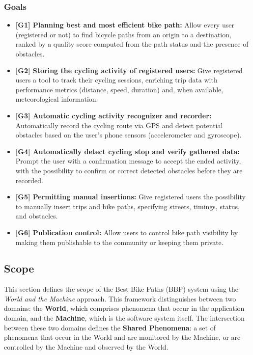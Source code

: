 \subsubsection{Goals}
\begin{itemize}
    \item[] \textbf{[G1] Planning best and most efficient bike path:} 
    Allow every user (registered or not) to find bicycle paths from an origin to a destination, ranked by a quality score computed from the path status and the presence of obstacles.

    \item[] \textbf{[G2] Storing the cycling activity of registered users:} 
    Give registered users a tool to track their cycling sessions, enriching trip data with performance metrics (distance, speed, duration) and, when available, meteorological information.

    \item[] \textbf{[G3] Automatic cycling activity recognizer and recorder:} 
    Automatically record the cycling route via GPS and detect potential obstacles based on the user's phone sensors (accelerometer and gyroscope).

    \item[] \textbf{[G4] Automatically detect cycling stop and verify gathered data:} 
    Prompt the user with a confirmation message to accept the ended activity, with the possibility to confirm or correct detected obstacles before they are recorded.

    \item[] \textbf{[G5] Permitting manual insertions:} 
    Give registered users the possibility to manually insert trips and bike paths, specifying streets, timings, status, and obstacles.

    \item[] \textbf{[G6] Publication control:} 
    Allow users to control bike path visibility by making them publishable to the community or keeping them private.
\end{itemize}

\subsection{Scope}
This section defines the scope of the Best Bike Paths (BBP) system using the \textit{World and the Machine} approach. This framework distinguishes between two domains: the \textbf{World}, which comprises phenomena that occur in the application domain, and the \textbf{Machine}, which is the software system itself. The intersection between these two domains defines the \textbf{Shared Phenomena}: a set of phenomena that occur in the World and are monitored by the Machine, or are controlled by the Machine and observed by the World.

